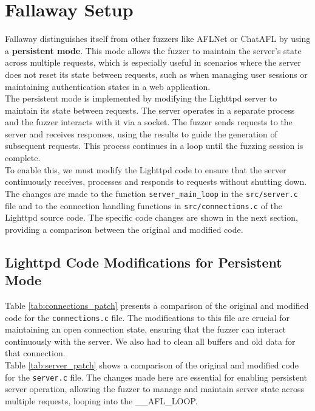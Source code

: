 \chapter{Fallaway Setup}

Fallaway distinguishes itself from other fuzzers like AFLNet or ChatAFL by using a \textbf{persistent mode}. This mode allows the fuzzer to maintain the server's state across multiple requests, which is especially useful in scenarios where the server does not reset its state between requests, such as when managing user sessions or maintaining authentication states in a web application.
\\The persistent mode is implemented by modifying the Lighttpd server to maintain its state between requests. The server operates in a separate process and the fuzzer interacts with it via a socket. The fuzzer sends requests to the server and receives responses, using the results to guide the generation of subsequent requests. This process continues in a loop until the fuzzing session is complete.
\\To enable this, we must modify the Lighttpd code to ensure that the server continuously receives, processes and responds to requests without shutting down. The changes are made to the function \texttt{server\_main\_loop} in the \texttt{src/server.c} file and to the connection handling functions in \texttt{src/connections.c} of the Lighttpd source code. The specific code changes are shown in the next section, providing a comparison between the original and modified code.

\section{Lighttpd Code Modifications for Persistent Mode}

Table \ref{tab:connections_patch} presents a comparison of the original and modified code for the \texttt{connections.c} file. The modifications to this file are crucial for maintaining an open connection state, ensuring that the fuzzer can interact continuously with the server. We also had to clean all buffers and old data for that connection.
\\Table \ref{tab:server_patch} shows a comparison of the original and modified code for the \texttt{server.c} file. The changes made here are essential for enabling persistent server operation, allowing the fuzzer to manage and maintain server state across multiple requests, looping into the \_\_AFL\_LOOP.

